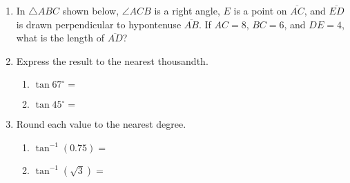\documentclass[12pt, twoside]{article}
\begin{document}
\begin{enumerate}
\item In $\triangle ABC$ shown below, $\angle ACB$ is a right angle, $E$ is a point on $\overline{AC}$, and $\overline{ED}$ is drawn perpendicular to hypontenuse $\overline{AB}$. If $AC = 8$, $BC = 6$, and $DE = 4$, what is the length of $\overline{AD}$? 
\begin{flushright}
\end{flushright} 

\newpage
\item Express the result to the nearest thousandth.  \vspace{.5cm}
    \begin{multicols}{2}
      \begin{enumerate}
        \item $\tan 67^\circ = $ \vspace{1cm}
        \item $\tan 45^\circ =$
      \end{enumerate}
    \end{multicols} \vspace{1cm}

\item Round each value to the nearest degree.  \vspace{.5cm}
    \begin{multicols}{2}
      \begin{enumerate}
        \item $\tan^{-1} (0.75) = $ \vspace{1cm}
        \item $\tan^{-1} (\sqrt{3}) =$
      \end{enumerate}
    \end{multicols} \vspace{1cm}


\end{enumerate}
\end{document}

